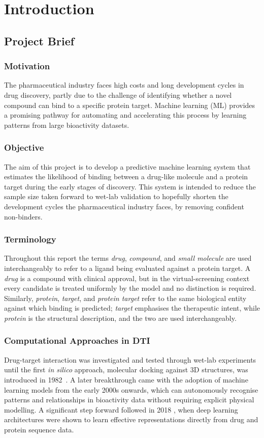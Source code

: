 \chapter{Introduction}
\section{Project Brief}
\subsection{Motivation}
The pharmaceutical industry faces high costs and long development cycles in drug discovery, partly due to the challenge of identifying whether a novel compound can bind to a specific protein target.
Machine learning (ML) provides a promising pathway for automating and accelerating this process by learning patterns from large bioactivity datasets.
\subsection{Objective}
The aim of this project is to develop a predictive machine learning system that estimates the likelihood of binding between a drug-like molecule and a protein target during the early stages of discovery.
This system is intended to reduce the sample size taken forward to wet-lab validation to hopefully shorten the development cycles the pharmaceutical industry faces, by removing confident non-binders.
\subsection{Terminology}
Throughout this report the terms \textit{drug}, \textit{compound}, and \textit{small molecule} are used interchangeably to refer to a ligand being evaluated against a protein target.
A \textit{drug} is a compound with clinical approval, but in the virtual-screening context every candidate is treated uniformly by the model and no distinction is required.
Similarly, \textit{protein}, \textit{target}, and \textit{protein target} refer to the same biological entity against which binding is predicted; \textit{target} emphasises the therapeutic intent, while \textit{protein} is the structural description, and the two are used interchangeably.
\subsection{Computational Approaches in DTI}
Drug-target interaction was investigated and tested through wet-lab experiments until the first \textit{in silico} approach, molecular docking against 3D structures, was introduced in 1982~\citep{Ru2025InSilicoDTI}.
A later breakthrough came with the adoption of machine learning models from the early 2000s onwards, which can autonomously recognise patterns and relationships in bioactivity data without requiring explicit physical modelling.
A significant step forward followed in 2018 \citep{Ozturk2018}, when deep learning architectures were shown to learn effective representations directly from drug and protein sequence data.
